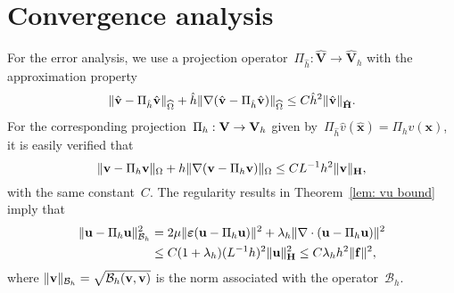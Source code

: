 \documentclass[11pt]{article}
\newcommand{\calB}{\mathcal{B}}
\newcommand{\vf}{{\bf f}}
\newcommand{\vu}{{\bf u}}
\newcommand{\vv}{{\bf v}}
\newcommand{\vV}{{\bf V}}
\newcommand{\vH}{{\bf H}}
\newcommand{\vVhat}{\mathbf{\hat V}}
\newcommand{\vHhat}{\mathbf{\hat H}}
\newcommand{\bsx}{{\boldsymbol{x}}}
\numberwithin{equation}{section}
\newcommand{\veps}{{\boldsymbol{\varepsilon}}}
\begin{document}
\section{Convergence analysis}\label{ConvAna}
For the error analysis, we use a projection
operator~$\Pi_{\hat h}:\vVhat\to\vVhat_h$ with
the approximation property
\[
\|\hat\vv-\Pi_{\hat h}\hat\vv\|_{\widehat\Omega}
    +\hat h\|\nabla(\hat\vv-\Pi_{\hat h}\hat\vv)\|_{\widehat\Omega}
    \le C\hat h^2\|\hat\vv\|_{\vHhat}.
\]
For the corresponding projection~$\Pi_h:\vV\to\vV_h$ given
by~$\Pi_{\hat h}\hat v(\hat\bsx)=\Pi_hv(\bsx)$, it is easily verified that
\begin{equation} \label{projection estimate}
\|\vv-\Pi_h\vv\|_\Omega+h\|\nabla(\vv-\Pi_h\vv)\|_\Omega
    \le CL^{-1}h^2\|\vv\|_{\vH},
\end{equation}
with the same constant~$C$.
The regularity results in Theorem~\ref{lem: vu bound} imply that
\begin{equation}\label{projection estimate Bh}
\begin{aligned}
\|\vu-\Pi_h \vu\|_{\calB_h}^2&=2\mu\|\veps(\vu-\Pi_h \vu)\|^2
     +\lambda_h\|\nabla \cdot (\vu-\Pi_h \vu)\|^2\\
    &\le C(1+\lambda_h)(L^{-1}h)^2\|\vu\|_{\vH}^2
     \le C\lambda_h h^2\|\vf\|^2,
\end{aligned}
\end{equation}
where $\|\vv\|_{\calB_h}=\sqrt{\calB_h(\vv,\vv)}$ is the norm associated with
the operator~$\calB_h$.
\end{document}
